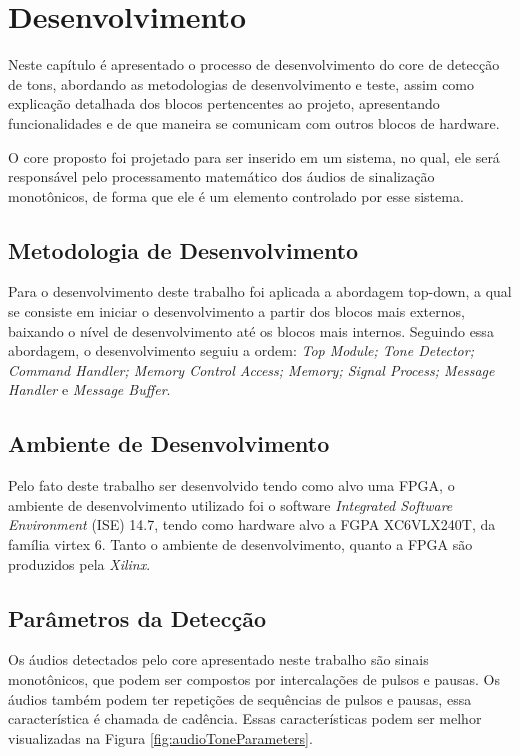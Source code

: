 \documentclass[monografia]{subfiles}
\begin{document}
\chapter{Desenvolvimento}
	Neste capítulo é apresentado o processo de desenvolvimento do core de detecção de tons, abordando as 
	metodologias de desenvolvimento e teste, assim como explicação detalhada dos blocos pertencentes
	ao projeto, apresentando funcionalidades e de que maneira se comunicam com outros blocos de hardware.

	O core proposto foi projetado para ser inserido em um sistema, no qual, ele será responsável pelo processamento matemático
	dos áudios de sinalização monotônicos, de forma que ele é um elemento controlado por esse sistema.


\section{Metodologia de Desenvolvimento}
	Para o desenvolvimento deste trabalho foi aplicada a abordagem top-down, a qual se consiste em iniciar o desenvolvimento
	a partir dos blocos mais externos, baixando o nível de desenvolvimento até os blocos mais internos. Seguindo essa abordagem, 
	o desenvolvimento seguiu a ordem: \textit {Top Module; Tone Detector; Command Handler; Memory Control Access; Memory; 
	Signal Process; Message Handler} e \textit {Message Buffer}. 


\section{Ambiente de Desenvolvimento}
	Pelo fato deste trabalho ser desenvolvido tendo como alvo uma FPGA, o ambiente de desenvolvimento utilizado 
	foi o software \textit{Integrated Software Environment} (ISE) 14.7, tendo como hardware alvo a FGPA XC6VLX240T, da família virtex 6.
	Tanto o ambiente de desenvolvimento, quanto a FPGA são produzidos pela \textit{Xilinx}.

\section{Parâmetros da Detecção}
\label{sec:detectionParametersSection}
	Os áudios detectados pelo core apresentado neste trabalho são sinais monotônicos, que podem ser compostos por intercalações
	de pulsos e pausas. Os áudios também podem ter repetições de sequências de pulsos e pausas, essa característica é chamada de
	cadência. Essas características podem ser  melhor visualizadas na Figura \ref{fig:audioToneParameters}.
\end{document}
